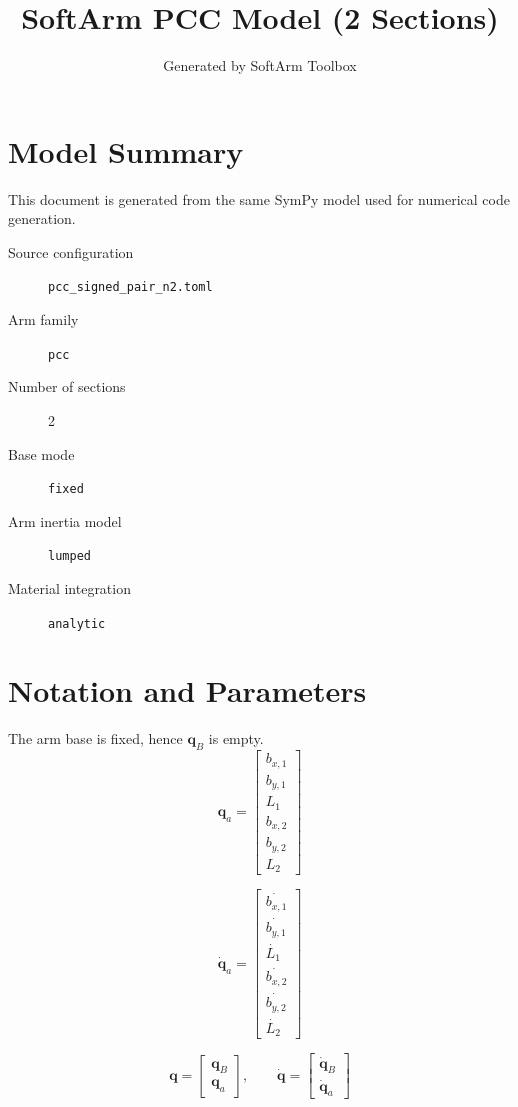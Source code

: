 \documentclass[11pt]{article}
\title{SoftArm PCC Model (2 Sections)}
\author{Generated by SoftArm Toolbox}
\date{}
\begin{document}
\maketitle

\section{Model Summary}
This document is generated from the same SymPy model used for numerical code generation.
\begin{description}
\item[Source configuration] \texttt{pcc\_signed\_pair\_n2.toml}
\item[Arm family] \texttt{pcc}
\item[Number of sections] 2
\item[Base mode] \texttt{fixed}
\item[Arm inertia model] \texttt{lumped}
\item[Material integration] \texttt{analytic}
\end{description}

\section{Notation and Parameters}
The arm base is fixed, hence $\boldsymbol q_B$ is empty.
\begin{equation}
\boldsymbol q_a=\begin{bmatrix}b_{x,1}\\b_{y,1}\\L_{1}\\b_{x,2}\\b_{y,2}\\L_{2}\end{bmatrix}
\end{equation}

\begin{equation}
\dot{\boldsymbol q}_a=\begin{bmatrix}\dot{b_{x,1}}\\\dot{b_{y,1}}\\\dot{L_{1}}\\\dot{b_{x,2}}\\\dot{b_{y,2}}\\\dot{L_{2}}\end{bmatrix}
\end{equation}

\begin{equation}
\boldsymbol q=\begin{bmatrix}\boldsymbol q_B\\\boldsymbol q_a\end{bmatrix},\qquad \dot{\boldsymbol q}=\begin{bmatrix}\dot{\boldsymbol q}_B\\\dot{\boldsymbol q}_a\end{bmatrix}
\end{equation}
\end{document}
